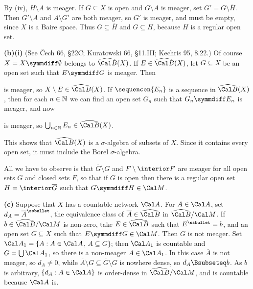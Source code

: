 {\medskip

 By (iv), $H\setminus A$ is meager.   If $G\subseteq X$ is
open and $G\setminus A$ is meager, set $G'=G\setminus\overline{H}$.
Then $G'\setminus A$ and $A\setminus G'$ are both meager, so $G'$ is
meager, and must be empty, since $X$ is a Baire space.   Thus
$G\subseteq\overline{H}$ and $G\subseteq H$, because $H$ is a regular open
set.

\medskip

{\bf (b)(i)} (See {\smc \v{C}ech 66}, \S22C;  {\smc Kuratowski 66},
\S11.III;  {\smc Kechris 95}, 8.22.)
Of course $X=X\symmdiff\emptyset$ belongs to $\widehat{\Cal B}(X)$.   If
$E\in\widehat{\Cal B}(X)$, let $G\subseteq X$ be an open set such that
$E\symmdiff G$ is meager.   Then


\noindent is meager, so $X\setminus E\in\widehat{\Cal B}(X)$.   If
$\sequencen{E_n}$ is a sequence in $\widehat{\Cal B}(X)$, then for each
$n\in\Bbb N$ we can find an open set $G_n$ such that $G_n\symmdiff E_n$
is meager, and now


\noindent is meager, so $\bigcup_{n\in\Bbb N}E_n\in\widehat{\Cal B}(X)$.

This shows that $\widehat{\Cal B}(X)$ is a $\sigma$-algebra of subsets
of $X$.   Since it contains every open set, it must include the Borel
$\sigma$-algebra.

\medskip

 All we have to observe is that
$\overline{G}\setminus G$ and $F\setminus\interior F$ are meager for all
open sets $G$ and closed sets $F$, so that if $G$ is open then there is a
regular open set $H=\interior\overline{G}$ such that
$G\symmdiff H\in\Cal M$.

\medskip

{\bf (c)} Suppose that $X$ has a countable network $\Cal A$.   For
$A\in\Cal A$, set $d_A=\overline{A}^{\ssbullet}$, the equivalence class
of $\overline{A}\in\widehat{\Cal B}$
in $\widehat{\Cal B}/\Cal M$.   If $b\in\widehat{\Cal B}/\Cal M$ is
non-zero, take $E\in\widehat{\Cal B}$ such that $E^{\ssbullet}=b$, and an open set $G\subseteq X$ such that
$E\symmdiff G\in\Cal M$.   Then $G$ is not meager.   Set $\Cal
A_1=\{A:A\in\Cal A$, $A\subseteq G\}$;  then $\Cal A_1$ is countable and
$G=\bigcup\Cal A_1$, so there is a non-meager $A\in\Cal A_1$.   In this
case $\overline{A}$ is not meager, so $d_A\ne 0$, while
$\overline{A}\setminus G\subseteq\overline{G}\setminus G$ is nowhere
dense, so $d_A\Bsubseteq b$.   As $b$ is arbitrary,
$\{d_A:A\in\Cal A\}$ is order-dense in $\widehat{\Cal B}/\Cal M$, and is
countable because $\Cal A$ is.
}%

